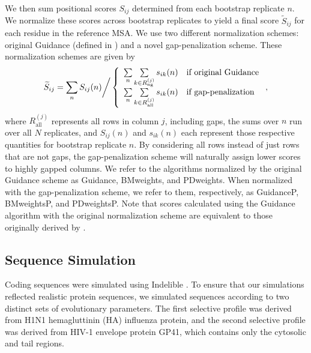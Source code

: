 \documentclass[11pt]{article}
\begin{document}
We then sum positional scores $S_{ij}$ determined from each bootstrap replicate $n$. We normalize these scores across bootstrap replicates to yield a final score $\widetilde{S}_{ij}$ for each residue in the reference MSA. We use two different normalization schemes: original Guidance (defined in \citet{Penn2010}) and a novel gap-penalization scheme. These normalization schemes are given by \begin{equation}
\widetilde{S}_{ij}  = \sum_n S_{ij}(n) \bigg{/} \left\{ \begin{array}{rl}

              \sum\limits_n \sum\limits_{k \in R_\text{ng}^{(j)}} s_{ik}(n)     &\mbox{if original Guidance} \\
              \sum\limits_n \sum\limits_{k \in R_\text{all}^{(j)}} s_{ik}(n)     &\mbox{if gap-penalization} \\      
        \end{array} \right.,
\end{equation} 
where $R_\text{all}^{(j)}$ represents all rows in column $j$, including gaps, the sums over $n$ run over all $N$ replicates, and $S_{ij}(n)$ and $s_{ik}(n)$ each represent those respective quantities for bootstrap replicate $n$. By considering all rows instead of just rows that are not gaps, the gap-penalization scheme will naturally assign lower scores to highly gapped columns. We refer to the algorithms normalized by the original Guidance scheme as Guidance, BMweights, and PDweights. When normalized with the gap-penalization scheme, we refer to them, respectively, as GuidanceP, BMweightsP, and PDweightsP. Note that scores calculated using the Guidance algorithm with the original normalization scheme are equivalent to those originally derived by \citet{Penn2010}. 



\subsection*{Sequence Simulation}
Coding sequences were simulated using Indelible \citep{Fletcher2009}. To ensure that our simulations reflected realistic protein sequences, we simulated sequences according to two distinct sets of evolutionary parameters. The first selective profile was derived from H1N1 hemagluttinin (HA) influenza protein, and the second selective profile was derived from HIV-1 envelope protein GP41, which contains only the cytosolic and tail regions. 
\end{document}
